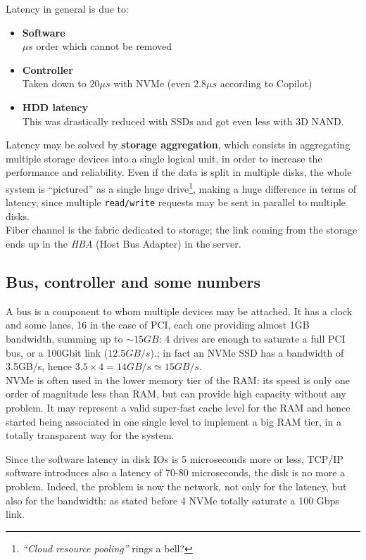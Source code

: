 Latency in general is due to:
\begin{itemize}
   \item \textbf{Software}\\
   $\mu s$ order which cannot be removed
   \item \textbf{Controller}\\
   Taken down to $20\mu s$ with NVMe (even $2.8\mu s$ according to Copilot)
   \item \textbf{HDD latency}\\
   This was drastically reduced with SSDs and got even less with 3D NAND.
\end{itemize}
Latency may be solved by \textbf{storage aggregation}, which consists in aggregating multiple storage devices into a single logical unit, in order to increase the performance and reliability.
Even if the data is split in multiple disks, the whole system is ``pictured'' as a single huge drive\footnote{\textit{``Cloud resource pooling''} rings a bell?}, making a huge difference in terms of latency, since multiple \texttt{read/write} requests may be sent in parallel to multiple disks.\\
Fiber channel is the fabric dedicated to storage; the link coming from the storage ends up in the \textit{HBA} (Host Bus Adapter) in the server.

\subsection{Bus, controller and some numbers}
A bus is a component to whom multiple devices may be attached. It has a clock and some lanes, 16 in the case of PCI, each one providing almost 1GB bandwidth, summing up to $\sim 15GB$: 4 drives are enough to saturate a full PCI bus, or a 100Gbit link ($12.5GB/s$).;
in fact an NVMe SSD has a bandwidth of 3.5GB/s, hence $3.5\times 4 = 14GB/s \simeq 15GB/s$.\\
NVMe is often used in the lower memory tier of the RAM: its speed is only one order of magnitude less than RAM, but can provide high capacity without any problem.
It may represent a valid super-fast cache level for the RAM and hence started being associated in one single level to implement a big RAM tier, in a totally transparent way for the system.

Since the software latency in disk IOs is 5 microseconds more or less,
TCP/IP software introduces also a latency of 70-80 microseconds, the disk is
no more a problem. Indeed, the problem is now the network, not only for the
latency, but also for the bandwidth: as stated before 4 NVMe totally saturate a 100 Gbps
link.

